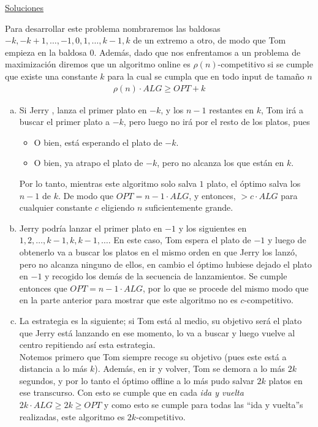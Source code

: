 \documentclass[dcc,uchile]{fcfmcourse}
\theoremstyle{plain}
\theoremstyle{definition}
\begin{document}
\newpage
\begin{center}
{\huge \underline{Soluciones}}
\end{center}
\begin{problems}
\item Para desarrollar este problema nombraremos las baldosas $-k, -k+1, \ldots, -1, 0, 1, \ldots, k-1, k$ de un extremo a otro, de modo que Tom empieza en la baldosa $0$. Además, dado que nos enfrentamos a un problema de maximización diremos que un algoritmo online es $\rho(n)$-competitivo si se cumple que existe una constante $k$ para la cual se cumpla que en todo input de tamaño $n$
\begin{align*}
    \rho(n)\cdot ALG \ge OPT + k
\end{align*}
\begin{enumerate}[a)]
    \item Si Jerry \demon, lanza el primer plato en $-k$, y los $n-1$ restantes en $k$, Tom irá a buscar el primer plato a $-k$, pero luego no irá por el resto de los platos, pues
    \begin{itemize}
        \item O bien, está esperando el plato de $-k$.
        \item O bien, ya atrapo el plato de $-k$, pero no alcanza los que están en $k$.
    \end{itemize}
    Por lo tanto, mientras este algoritmo solo salva $1$ plato, el óptimo salva los $n-1$ de $k$. De modo que $OPT = n-1\cdot ALG$, y entonces, $> c\cdot ALG$ para cualquier constante $c$ eligiendo $n$ suficientemente grande.
    \item Jerry podría lanzar el primer plato en $-1$ y los siguientes en $1, 2, \ldots, k-1, k, k-1, \ldots$. En este caso, Tom espera el plato de $-1$ y luego de obtenerlo va a buscar los platos en el mismo orden en que Jerry los lanzó, pero no alcanza ninguno de ellos, en cambio el óptimo hubiese dejado el plato en $-1$ y recogido los demás de la secuencia de lanzamientos. Se cumple entonces que $OPT = n-1\cdot ALG$, por lo que se procede del mismo modo que en la parte anterior para mostrar que este algoritmo no es $c$-competitivo.
    \item La estrategia es la siguiente; si Tom está al medio, su objetivo será el plato que Jerry está lanzando en ese momento, lo va a buscar y luego vuelve al centro repitiendo así esta estrategia.\\
    Notemos primero que Tom siempre recoge su objetivo (pues este está a distancia a lo más $k$). Además, en ir y volver, Tom se demora a lo más $2k$ segundos, y por lo tanto el óptimo offline a lo más pudo salvar $2k$ platos en ese transcurso. Con esto se cumple que en cada \textit{ida y vuelta} $2k\cdot ALG \ge 2k \ge OPT$ y como esto se cumple para todas las ``ida y vuelta''s realizadas, este algoritmo es $2k$-competitivo.

\end{enumerate}
\end{problems}
\end{document}
